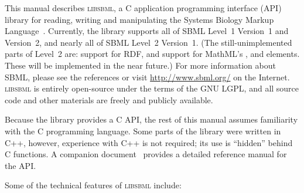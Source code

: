 \documentclass{sbmlmanual}
\newcommand{\libsbml}{\textsc{libsbml}}
\begin{document}
This manual describes \libsbml{}, a C application programming interface
(API) library for reading, writing and manipulating the Systems Biology
Markup Language~\citep[SBML;][]{hucka_2001b,hucka_2003,finney_2003b}.
Currently, the library supports all of SBML Level~1 Version~1 and
Version~2, and nearly all of SBML Level~2 Version~1.  (The
still-unimplemented parts of Level~2 are: support for RDF, and support for
MathML's ,  and 
elements.  These will be implemented in the near future.)  For more
information about SBML, please see the references or visit
\url{http://www.sbml.org/} on the Internet.  \libsbml{} is entirely
open-source under the terms of the GNU LGPL, and all source code and other
materials are freely and publicly available.

Because the library provides a C API, the rest of this manual assumes
familiarity with the C programming language.  Some parts of the library
were written in C++, however, experience with C++ is not required; its use
is ``hidden'' behind C functions.  A companion
document~\citep{bornstein_2004b} provides a detailed reference manual for
the API.

Some of the technical features of \libsbml{} include:
\end{document}
